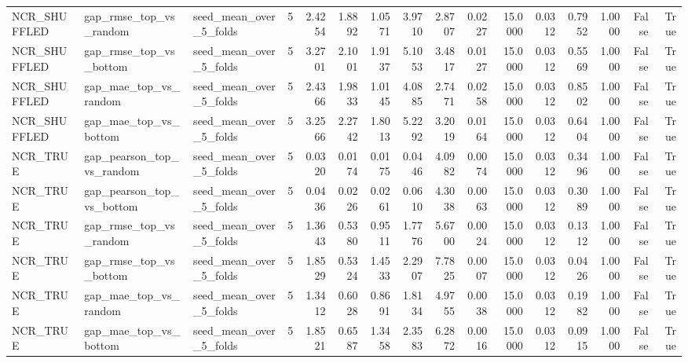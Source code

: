 \begin{tabular}{lllrrrrrrrrrrrrr}
NCR_SHUFFLED & gap_rmse_top_vs_random & seed_mean_over_5_folds & 5 & 2.4254 & 1.8892 & 1.0571 & 3.9710 & 2.8707 & 0.0227 & 15.0000 & 0.0312 & 0.7952 & 1.0000 & False & True \\
NCR_SHUFFLED & gap_rmse_top_vs_bottom & seed_mean_over_5_folds & 5 & 3.2701 & 2.1001 & 1.9137 & 5.1053 & 3.4817 & 0.0127 & 15.0000 & 0.0312 & 0.5569 & 1.0000 & False & True \\
NCR_SHUFFLED & gap_mae_top_vs_random & seed_mean_over_5_folds & 5 & 2.4366 & 1.9833 & 1.0145 & 4.0885 & 2.7471 & 0.0258 & 15.0000 & 0.0312 & 0.8502 & 1.0000 & False & True \\
NCR_SHUFFLED & gap_mae_top_vs_bottom & seed_mean_over_5_folds & 5 & 3.2566 & 2.2742 & 1.8013 & 5.2292 & 3.2019 & 0.0164 & 15.0000 & 0.0312 & 0.6404 & 1.0000 & False & True \\
NCR_TRUE & gap_pearson_top_vs_random & seed_mean_over_5_folds & 5 & 0.0320 & 0.0174 & 0.0175 & 0.0446 & 4.0982 & 0.0074 & 15.0000 & 0.0312 & 0.3496 & 1.0000 & False & True \\
NCR_TRUE & gap_pearson_top_vs_bottom & seed_mean_over_5_folds & 5 & 0.0436 & 0.0226 & 0.0261 & 0.0610 & 4.3038 & 0.0063 & 15.0000 & 0.0312 & 0.3089 & 1.0000 & False & True \\
NCR_TRUE & gap_rmse_top_vs_random & seed_mean_over_5_folds & 5 & 1.3643 & 0.5380 & 0.9511 & 1.7776 & 5.6700 & 0.0024 & 15.0000 & 0.0312 & 0.1312 & 1.0000 & False & True \\
NCR_TRUE & gap_rmse_top_vs_bottom & seed_mean_over_5_folds & 5 & 1.8529 & 0.5324 & 1.4533 & 2.2907 & 7.7825 & 0.0007 & 15.0000 & 0.0312 & 0.0426 & 1.0000 & False & True \\
NCR_TRUE & gap_mae_top_vs_random & seed_mean_over_5_folds & 5 & 1.3412 & 0.6028 & 0.8691 & 1.8134 & 4.9755 & 0.0038 & 15.0000 & 0.0312 & 0.1982 & 1.0000 & False & True \\
NCR_TRUE & gap_mae_top_vs_bottom & seed_mean_over_5_folds & 5 & 1.8521 & 0.6587 & 1.3458 & 2.3583 & 6.2872 & 0.0016 & 15.0000 & 0.0312 & 0.0915 & 1.0000 & False & True \\
\bottomrule
\end{tabular}

